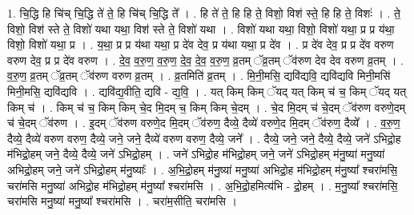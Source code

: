 \documentclass[17pt]{extarticle}
\begin{document}
1. चि॒द्धि हि चि॑च् चि॒द्धि ते॑ ते॒ हि चि॑च् चि॒द्धि ते᳚ । . हि ते॑ ते॒ हि हि ते॒ विशो॒ विश॑ स्ते॒ हि हि ते॒ विशः॑ । . ते॒ विशो॒ विश॑ स्ते ते॒ विशो॑ यथा यथा॒ विश॑ स्ते ते॒ विशो॑ यथा । . विशो॑ यथा यथा॒ विशो॒ विशो॑ यथा॒ प्र प्र य॑था॒ विशो॒ विशो॑ यथा॒ प्र । . य॒था॒ प्र प्र य॑था यथा॒ प्र दे॑व देव॒ प्र य॑था यथा॒ प्र दे॑व । . प्र दे॑व देव॒ प्र प्र दे॑व वरुण वरुण देव॒ प्र प्र दे॑व वरुण । . दे॒व॒ व॒रु॒ण॒ व॒रु॒ण॒ दे॒व॒ दे॒व॒ व॒रु॒ण॒ व्र॒तम् ॅव्र॒तम् ॅव॑रुण देव देव वरुण व्र॒तम् । . व॒रु॒ण॒ व्र॒तम् ॅव्र॒तम् ॅव॑रुण वरुण व्र॒तम् । . व्र॒तमिति॑ व्र॒तम् । . मि॒नी॒मसि॒ द्यवि॑द्यवि॒ द्यवि॑द्यवि मिनी॒मसि॑ मिनी॒मसि॒ द्यवि॑द्यवि । . द्यवि॑द्य॒वीति॒ द्यवि॑ - द्य॒वि॒ । . यत् किम् किम् ॅयद् यत् किम् च॑ च॒ किम् ॅयद् यत् किम् च॑ । . किम् च॑ च॒ किम् किम् चे॒द मि॒दम् च॒ किम् किम् चे॒दम् । . चे॒द मि॒दम् च॑ चे॒दम् ॅव॑रुण वरुणे॒दम् च॑ चे॒दम् ॅव॑रुण । . इ॒दम् ॅव॑रुण वरुणे॒द मि॒दम् ॅव॑रुण॒ दैव्ये॒ दैव्ये॑ वरुणे॒द मि॒दम् ॅव॑रुण॒ दैव्ये᳚ । . व॒रु॒ण॒ दैव्ये॒ दैव्ये॑ वरुण वरुण॒ दैव्ये॒ जने॒ जने॒ दैव्ये॑ वरुण वरुण॒ दैव्ये॒ जने᳚ । . दैव्ये॒ जने॒ जने॒ दैव्ये॒ दैव्ये॒ जने॑ ऽभिद्रो॒ह म॑भिद्रो॒हम् जने॒ दैव्ये॒ दैव्ये॒ जने॑ ऽभिद्रो॒हम् । . जने॑ ऽभिद्रो॒ह म॑भिद्रो॒हम् जने॒ जने॑ ऽभिद्रो॒हम् म॑नु॒ष्या॑ मनु॒ष्या॑ अभिद्रो॒हम् जने॒ जने॑ ऽभिद्रो॒हम् म॑नु॒ष्याः᳚ । . अ॒भि॒द्रो॒हम् म॑नु॒ष्या॑ मनु॒ष्या॑ अभिद्रो॒ह म॑भिद्रो॒हम् म॑नु॒ष्या᳚ श्चरा॑मसि॒ चरा॑मसि मनु॒ष्या॑ अभिद्रो॒ह म॑भिद्रो॒हम् म॑नु॒ष्या᳚ श्चरा॑मसि । . अ॒भि॒द्रो॒हमित्य॑भि - द्रो॒हम् । . म॒नु॒ष्या᳚ श्चरा॑मसि॒ चरा॑मसि मनु॒ष्या॑ मनु॒ष्या᳚ श्चरा॑मसि । . चरा॑म॒सीति॒ चरा॑मसि । \newline
\end{document}
